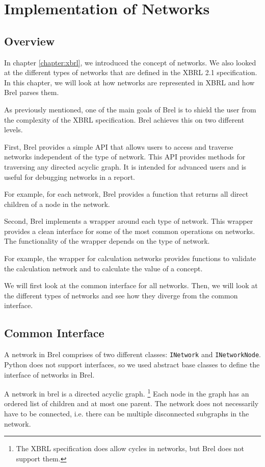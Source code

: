 \section{Implementation of Networks}

\subsection{Overview}

In chapter \ref{chapter:xbrl}, we introduced the concept of networks.
We also looked at the different types of networks that are defined in the XBRL 2.1 specification.
In this chapter, we will look at how networks are represented in XBRL and how Brel parses them.

As previously mentioned, one of the main goals of Brel is to shield the user from the complexity of the XBRL specification.
Brel achieves this on two different levels.

First, Brel provides a simple API that allows users to access and traverse networks independent of the type of network.
This API provides methods for traversing any directed acyclic graph.
It is intended for advanced users and is useful for debugging networks in a report.

For example, for each network, Brel provides a function that returns all direct children of a node in the network.

Second, Brel implements a wrapper around each type of network.
This wrapper provides a clean interface for some of the most common operations on networks.
The functionality of the wrapper depends on the type of network.

For example, the wrapper for calculation networks provides functions to validate the calculation network and to calculate the value of a concept.

We will first look at the common interface for all networks.
Then, we will look at the different types of networks and see how they diverge from the common interface.

\subsection{Common Interface}

A network in Brel comprises of two different classes: \texttt{INetwork} and \texttt{INetworkNode}.
Python does not support interfaces, so we used abstract base classes to define the interface of networks in Brel.

A network in brel is a directed acyclic graph.
\footnote{The XBRL specification does allow cycles in networks, but Brel does not support them.}
Each node in the graph has an ordered list of children and at most one parent.
The network does not necessarily have to be connected, i.e. there can be multiple disconnected subgraphs in the network.


